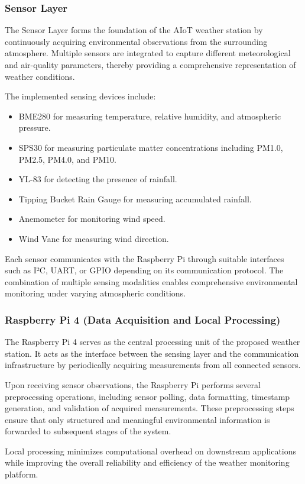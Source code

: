 \documentclass[12pt]{article}
\begin{document}
\subsubsection{Sensor Layer}
The Sensor Layer forms the foundation of the AIoT weather station by continuously acquiring environmental observations from the surrounding atmosphere. Multiple sensors are integrated to capture different meteorological and air-quality parameters, thereby providing a comprehensive representation of weather conditions.

The implemented sensing devices include:
\begin{itemize}
    \item BME280 for measuring temperature, relative humidity, and atmospheric pressure.
    \item SPS30 for measuring particulate matter concentrations including PM1.0, PM2.5, PM4.0, and PM10.
    \item YL-83 for detecting the presence of rainfall.
    \item Tipping Bucket Rain Gauge for measuring accumulated rainfall.
    \item Anemometer for monitoring wind speed.
    \item Wind Vane for measuring wind direction.
\end{itemize}
Each sensor communicates with the Raspberry Pi through suitable interfaces such as I²C, UART, or GPIO depending on its communication protocol. The combination of multiple sensing modalities enables comprehensive environmental monitoring under varying atmospheric conditions.

\subsubsection{Raspberry Pi 4 (Data Acquisition and Local Processing)}
The Raspberry Pi 4 serves as the central processing unit of the proposed weather station. It acts as the interface between the sensing layer and the communication infrastructure by periodically acquiring measurements from all connected sensors.

Upon receiving sensor observations, the Raspberry Pi performs several preprocessing operations, including sensor polling, data formatting, timestamp generation, and validation of acquired measurements. These preprocessing steps ensure that only structured and meaningful environmental information is forwarded to subsequent stages of the system.

Local processing minimizes computational overhead on downstream applications while improving the overall reliability and efficiency of the weather monitoring platform.
\end{document}
